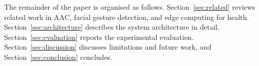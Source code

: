The remainder of the paper is organised as follows. Section~\ref{sec:related} reviews
related work in AAC, facial gesture detection, and edge computing for health.
Section~\ref{sec:architecture} describes the system architecture in detail.
Section~\ref{sec:evaluation} reports the experimental evaluation.
Section~\ref{sec:discussion} discusses limitations and future work, and
Section~\ref{sec:conclusion} concludes.